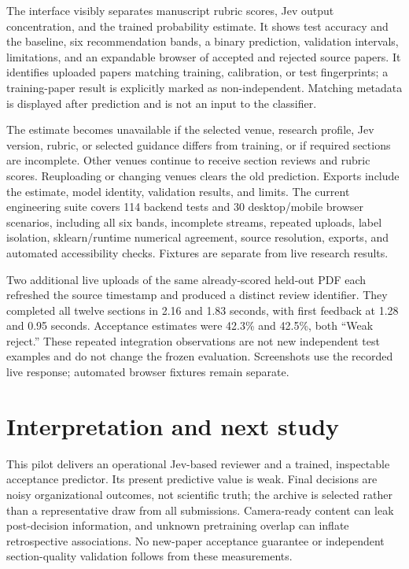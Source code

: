 \documentclass[11pt]{article}
\begin{document}
The interface visibly separates manuscript rubric scores, Jev output concentration, and the trained probability estimate. It shows test accuracy and the baseline, six recommendation bands, a binary prediction, validation intervals, limitations, and an expandable browser of accepted and rejected source papers. It identifies uploaded papers matching training, calibration, or test fingerprints; a training-paper result is explicitly marked as non-independent. Matching metadata is displayed after prediction and is not an input to the classifier.

The estimate becomes unavailable if the selected venue, research profile, Jev version, rubric, or selected guidance differs from training, or if required sections are incomplete. Other venues continue to receive section reviews and rubric scores. Reuploading or changing venues clears the old prediction. Exports include the estimate, model identity, validation results, and limits. The current engineering suite covers 114 backend tests and 30 desktop/mobile browser scenarios, including all six bands, incomplete streams, repeated uploads, label isolation, sklearn/runtime numerical agreement, source resolution, exports, and automated accessibility checks. Fixtures are separate from live research results.

Two additional live uploads of the same already-scored held-out PDF each refreshed the source timestamp and produced a distinct review identifier. They completed all twelve sections in 2.16 and 1.83 seconds, with first feedback at 1.28 and 0.95 seconds. Acceptance estimates were 42.3\% and 42.5\%, both ``Weak reject.'' These repeated integration observations are not new independent test examples and do not change the frozen evaluation. Screenshots use the recorded live response; automated browser fixtures remain separate.

\section{Interpretation and next study}
This pilot delivers an operational Jev-based reviewer and a trained, inspectable acceptance predictor. Its present predictive value is weak. Final decisions are noisy organizational outcomes, not scientific truth; the archive is selected rather than a representative draw from all submissions. Camera-ready content can leak post-decision information, and unknown pretraining overlap can inflate retrospective associations. No new-paper acceptance guarantee or independent section-quality validation follows from these measurements.
\end{document}
